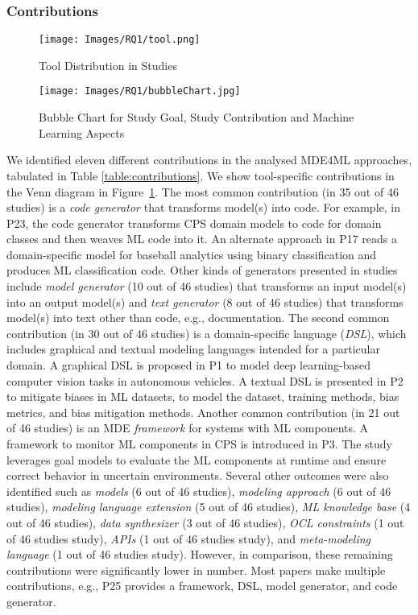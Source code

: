 \subsubsection{Contributions}
\begin{figure}[htbp]
    \centering
    \texttt{[image: Images/RQ1/tool.png]}
    \caption{Tool Distribution in Studies}
    \label{fig:tools}
\end{figure}

\begin{figure*}[htbp]
    \centering
    \texttt{[image: Images/RQ1/bubbleChart.jpg]}
    \caption{Bubble Chart for Study Goal, Study Contribution and Machine Learning Aspects}
    \label{fig:GoalvsContribution}
    \vspace*{-1em}
\end{figure*}


We identified eleven different contributions in the analysed MDE4ML approaches, tabulated in Table \ref{table:contributions}. We show tool-specific contributions in the Venn diagram in Figure~\ref{fig:tools}. The most common contribution (in 35 out of 46 studies) is a \textit{code generator} that transforms model(s) into code. For example, in P23, the code generator transforms CPS domain models to code for domain classes and then weaves ML code into it. An alternate approach in P17 reads a domain-specific model for baseball analytics using binary classification and produces ML classification code. Other kinds of generators presented in studies include \textit{model generator} (10 out of 46 studies) that transforms an input model(s) into an output model(s) and \textit{text generator} (8 out of 46 studies) that transforms model(s) into text other than code, e.g., documentation. The second common contribution (in 30 out of 46 studies) is a domain-specific language (\textit{DSL}), which includes graphical and textual modeling languages intended for a particular domain. A graphical DSL is proposed in P1 to model deep learning-based computer vision tasks in autonomous vehicles. A textual DSL is presented in P2 to mitigate biases in ML datasets, to model the dataset, training methods, bias metrics, and bias mitigation methods. Another common contribution (in 21 out of 46 studies) is an MDE \textit{framework} for systems with ML components. A framework to monitor ML components in CPS is introduced in P3. The study leverages goal models to evaluate the ML components at runtime and ensure correct behavior in uncertain environments. Several other outcomes were also identified such as \textit{models} (6 out of 46 studies), \textit{modeling approach} (6 out of 46 studies), 
\textit{modeling language extension} (5 out of 46 studies), 
\textit{ML knowledge base} (4 out of 46 studies),
\textit{data synthesizer} (3 out of 46 studies),
\textit{OCL constraints} (1 out of 46 studies study), \textit{APIs} (1 out of 46 studies study), and \textit{meta-modeling language} (1 out of 46 studies study). However, in comparison, these remaining contributions were significantly lower in number. Most papers make multiple contributions, e.g., P25 provides a framework, DSL, model generator, and code generator.




